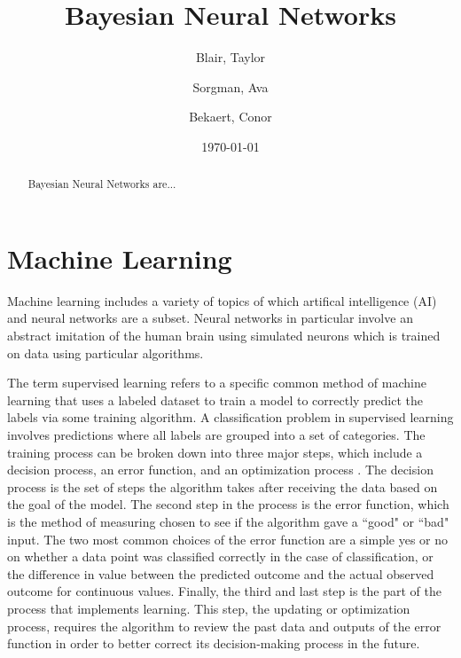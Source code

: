\documentclass[12pt]{article}
\title{Bayesian Neural Networks}
\author{
	Blair, Taylor
	\and
	Sorgman, Ava
	\and
	Bekaert, Conor
}
\date{\today}
\begin{document}
\doublespacing
\maketitle



\begin{abstract}
	Bayesian Neural Networks are...
\end{abstract}

\tableofcontents

	
\section{Machine Learning}
	
Machine learning includes a variety of topics of which artifical intelligence (AI) and neural networks are a subset. Neural networks in particular involve an abstract imitation of the human brain using simulated neurons which is trained on data using particular algorithms. 

The term supervised learning refers to a specific common method of machine learning that uses a labeled dataset to train a model to correctly predict the labels via some training algorithm. A classification problem in supervised learning involves predictions where all labels are grouped into a set of categories. The training process can be broken down into three major steps, which include a decision process, an error function, and an optimization process \cite{berkelyWhatIsML}. The decision process is the set of steps the algorithm takes after receiving the data based on the goal of the model. The second step in the process is the error function, which is the method of measuring chosen to see if the algorithm gave a ``good" or ``bad" input. The two most common choices of the error function are a simple yes or no on whether a data point was classified correctly in the case of classification, or the difference in value between the predicted outcome and the actual observed outcome for continuous values. Finally, the third and last step is the part of the process that implements learning. This step, the updating or optimization process, requires the algorithm to review the past data and outputs of the error function in order to better correct its decision-making process in the future.
\end{document}
